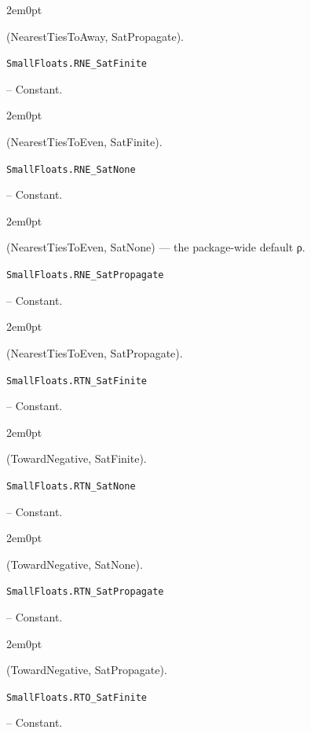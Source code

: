 \begin{adjustwidth}{2em}{0pt}

(NearestTiesToAway, SatPropagate).



\end{adjustwidth}
\hypertarget{3359638186361138749}{\texttt{SmallFloats.RNE\_SatFinite}}  -- {Constant.}

\begin{adjustwidth}{2em}{0pt}

(NearestTiesToEven, SatFinite).



\end{adjustwidth}
\hypertarget{6254846941289803954}{\texttt{SmallFloats.RNE\_SatNone}}  -- {Constant.}

\begin{adjustwidth}{2em}{0pt}

(NearestTiesToEven, SatNone) — the package-wide default ρ.



\end{adjustwidth}
\hypertarget{15613002957007008711}{\texttt{SmallFloats.RNE\_SatPropagate}}  -- {Constant.}

\begin{adjustwidth}{2em}{0pt}

(NearestTiesToEven, SatPropagate).



\end{adjustwidth}
\hypertarget{6431776125964272887}{\texttt{SmallFloats.RTN\_SatFinite}}  -- {Constant.}

\begin{adjustwidth}{2em}{0pt}

(TowardNegative, SatFinite).



\end{adjustwidth}
\hypertarget{18308597707086069238}{\texttt{SmallFloats.RTN\_SatNone}}  -- {Constant.}

\begin{adjustwidth}{2em}{0pt}

(TowardNegative, SatNone).



\end{adjustwidth}
\hypertarget{15860643992407021701}{\texttt{SmallFloats.RTN\_SatPropagate}}  -- {Constant.}

\begin{adjustwidth}{2em}{0pt}

(TowardNegative, SatPropagate).



\end{adjustwidth}
\hypertarget{1023017805428823485}{\texttt{SmallFloats.RTO\_SatFinite}}  -- {Constant.}

